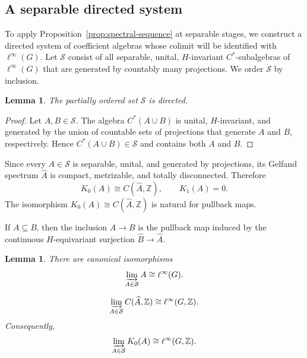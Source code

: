 \documentclass[pdflatex,sn-mathphys-num]{sn-jnl}%
\theoremstyle{plain}
\newtheorem{lemma}[theorem]{Lemma}
\theoremstyle{remark}
\theoremstyle{definition}
\numberwithin{equation}{section}
\begin{document}
\subsection{A separable directed system}

To apply Proposition~\ref{prop:spectral-sequence} at separable stages, we construct a directed system of coefficient algebras whose colimit will be identified with \( \ell^\infty(G) \). Let \( \mathcal S \) consist of all separable, unital, \( H \)-invariant \( C^* \)-subalgebras of \( \ell^\infty(G) \) that are generated by countably many projections. We order \( \mathcal S \) by inclusion.

\begin{lemma}
\label{lem:stage-system-directed}
The partially ordered set \( \mathcal S \) is directed.
\end{lemma}

\begin{proof}
Let \( A,B\in\mathcal S \). The algebra \( C^*(A\cup B) \) is unital, \( H \)-invariant, and generated by the union of countable sets of projections that generate \( A \) and \( B \), respectively. Hence \( C^*(A\cup B)\in\mathcal S \) and contains both \( A \) and \( B \).
\end{proof}

Since every \( A\in\mathcal S \) is separable, unital, and generated by projections, its Gelfand spectrum \( \widehat{A} \) is compact, metrizable, and totally disconnected. Therefore
\begin{equation}
\label{eq:stage-coefficient-k-theory}
K_0(A)\cong C(\widehat{A},\mathbb Z),
\qquad
K_1(A)=0.
\end{equation}
The isomorphism \( K_0(A)\cong C(\widehat{A},\mathbb Z) \) is natural for pullback maps.

If \( A\subseteq B \), then the inclusion \( A\to B \) is the pullback map induced by the continuous \( H \)-equivariant surjection \( \widehat{B}\to\widehat{A} \).

\begin{lemma}
\label{lem:coefficient-colimits}
There are canonical isomorphisms
\begin{equation}
\label{eq:coefficient-stage-colimit}
\varinjlim_{A\in\mathcal S}A
\cong
\ell^\infty(G).
\end{equation}

\begin{equation}
\label{eq:integer-stage-colimit}
\varinjlim_{A\in\mathcal S}C(\widehat{A},\mathbb Z)
\cong
\ell^\infty(G,\mathbb Z).
\end{equation}
Consequently,
\[
\varinjlim_{A\in\mathcal S}K_0(A)\cong\ell^\infty(G,\mathbb Z).
\]
\end{lemma}
\end{document}
